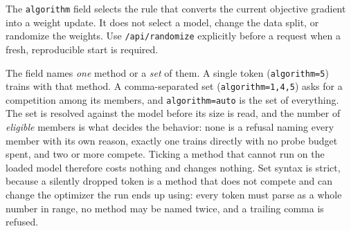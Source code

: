 The \texttt{algorithm} field selects the rule that converts the current
objective gradient into a weight update. It does not select a model, change the
data split, or randomize the weights. Use \texttt{/api/randomize} explicitly
before a request when a fresh, reproducible start is required.

The field names \emph{one} method or a \emph{set} of them. A single token
(\texttt{algorithm=5}) trains with that method. A comma-separated set
(\texttt{algorithm=1,4,5}) asks for a competition among its members, and
\texttt{algorithm=auto} is the set of everything. The set is resolved against
the model before its size is read, and the number of \emph{eligible} members is
what decides the behavior: none is a refusal naming every member with its own
reason, exactly one trains directly with no probe budget spent, and two or more
compete. Ticking a method that cannot run on the loaded model therefore costs
nothing and changes nothing. Set syntax is strict, because a silently dropped
token is a method that does not compete and can change the optimizer the run
ends up using: every token must parse as a whole number in range, no method may
be named twice, and a trailing comma is refused.

